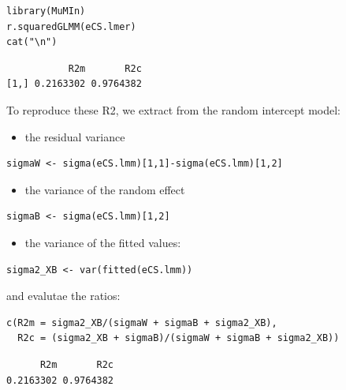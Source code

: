\documentclass[12pt]{article}
\begin{document}
\lstset{language=r,label= ,caption= ,captionpos=b,numbers=none}
\begin{lstlisting}
library(MuMIn)
r.squaredGLMM(eCS.lmer)
cat("\n")
\end{lstlisting}

\begin{verbatim}
           R2m       R2c
[1,] 0.2163302 0.9764382
\end{verbatim}


To reproduce these R2, we extract from the random intercept model:
\begin{itemize}
\item the residual variance
\end{itemize}
\lstset{language=r,label= ,caption= ,captionpos=b,numbers=none}
\begin{lstlisting}
sigmaW <- sigma(eCS.lmm)[1,1]-sigma(eCS.lmm)[1,2]
\end{lstlisting}

\begin{itemize}
\item the variance of the random effect
\end{itemize}
\lstset{language=r,label= ,caption= ,captionpos=b,numbers=none}
\begin{lstlisting}
sigmaB <- sigma(eCS.lmm)[1,2]
\end{lstlisting}

\begin{itemize}
\item the variance of the fitted values:
\end{itemize}
\lstset{language=r,label= ,caption= ,captionpos=b,numbers=none}
\begin{lstlisting}
sigma2_XB <- var(fitted(eCS.lmm))
\end{lstlisting}

and evalutae the ratios:
\lstset{language=r,label= ,caption= ,captionpos=b,numbers=none}
\begin{lstlisting}
c(R2m = sigma2_XB/(sigmaW + sigmaB + sigma2_XB),
  R2c = (sigma2_XB + sigmaB)/(sigmaW + sigmaB + sigma2_XB))
\end{lstlisting}

\begin{verbatim}
      R2m       R2c 
0.2163302 0.9764382
\end{verbatim}
\end{document}
